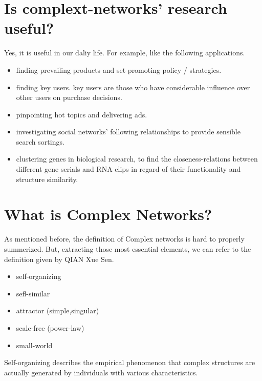 \documentclass[UTF8, 11pt, a4paper]{ctexart}
\begin{document}
\section{Is complext-networks' research useful?}
Yes, it is useful in our daliy life. For example, like the following applications.
\begin{itemize}
\item finding prevailing products
and set promoting policy / strategies. 
\item finding key users. key users are those who have considerable influence over other users on purchase decisions.
\item pinpointing hot topics and delivering ads.
\item investigating social networks' following relationships to provide sensible search sortings.
\item clustering genes in biological research, to find the closeness-relations between different gene serials and RNA clips in regard of their functionality and structure similarity.
\end{itemize}


\section{What is Complex Networks?}

As mentioned before, the definition of Complex networks is hard to properly summerized. But, extracting those most essential elements, we can refer to the definition given by QIAN Xue Sen.

\begin{itemize}
\item self-organizing
\item sefl-similar
\item attractor (simple,singular)
\item scale-free (power-law)
\item small-world
\end{itemize}

Self-organizing describes the empirical phenomenon that complex structures are actually generated by individuals with various characteristics.
\end{document}
